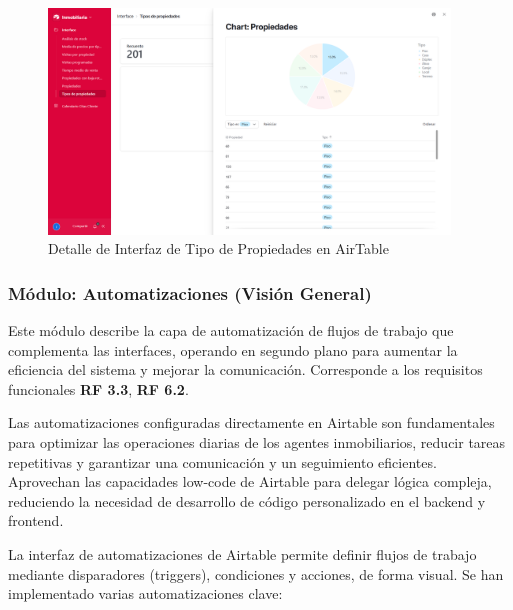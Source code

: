 \begin{enumerate}
    \begin{figure}[H]
        \begin{center}
            \includegraphics[width = 0.95\textwidth]{Figuras/interfazairtabletipopropiedadespiso.png}
        \end{center}
        \caption{\label{fig:interfazairtabletipopropiedadespiso} Detalle de Interfaz de Tipo de Propiedades en AirTable}
    \end{figure}

\end{enumerate}


\subsubsection{Módulo: Automatizaciones (Visión General)}


Este módulo describe la capa de automatización de flujos de trabajo que complementa las interfaces, operando en segundo plano para aumentar la eficiencia del sistema y mejorar la comunicación. Corresponde a los requisitos funcionales\textbf{ RF 3.3}, \textbf{RF 6.2}.

Las automatizaciones configuradas directamente en Airtable son fundamentales para optimizar las operaciones diarias de los agentes inmobiliarios, reducir tareas repetitivas y garantizar una comunicación y un seguimiento eficientes. Aprovechan las capacidades low-code de Airtable para delegar lógica compleja, reduciendo la necesidad de desarrollo de código personalizado en el backend y frontend.

La interfaz de automatizaciones de Airtable permite definir flujos de trabajo mediante disparadores (triggers), condiciones y acciones, de forma visual. Se han implementado varias automatizaciones clave:

